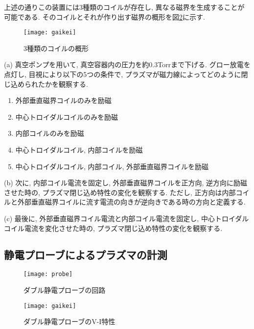 \documentclass[]{jsarticle}
\begin{document}
	上述の通りこの装置には3種類のコイルが存在し, 異なる磁界を生成することが可能である. そのコイルとそれが作り出す磁界の概形を図\ref{gaikei}に示す. 
	
	\begin{figure}[htbp]
	\begin{center}
	\texttt{[image: gaikei]}
	\caption{3種類のコイルの概形}
	\label{gaikei}
	\end{center}
	\end{figure}

	
	(a) 真空ポンプを用いて, 真空容器内の圧力を約0.3Torrまで下げる. グロー放電を点灯し, 目視により以下の5つの条件で, プラズマが磁力線によってどのように閉じ込められたかを観察する. 
	\begin{enumerate}
		\renewcommand{\labelenumi}{\Alph{enumi})}
		\item 外部垂直磁界コイルのみを励磁
		\item 中心トロイダルコイルのみを励磁
		\item 内部コイルのみを励磁
		\item 中心トロイダルコイル, 内部コイルを励磁
		\item 中心トロイダルコイル, 内部コイル, 外部垂直磁界コイルを励磁
	\end{enumerate}
	
	(b) 次に, 内部コイル電流を固定し, 外部垂直磁界コイルを正方向, 逆方向に励磁させた時の, プラズマ閉じ込め特性の変化を観察する. ただし, 正方向は内部コイルと外部垂直磁界コイルに流す電流の向きが逆向きである時の方向と定義する. 
	
	(c) 最後に, 外部垂直磁界コイル電流と内部コイル電流を固定し, 中心トロイダルコイル電流を変化させた時の, プラズマ閉じ込め特性の変化を観察する. 
	
	\subsection{静電プローブによるプラズマの計測\label{seiden}}
	
		\begin{figure}[htbp]
		\begin{minipage}{0.5\hsize}
			\begin{center}
				\texttt{[image: probe]}
				\caption{ダブル静電プローブの回路\cite{t}}
				\label{probe}
			\end{center}
		\end{minipage}
		\begin{minipage}{0.5\hsize}
			\begin{center}
				\texttt{[image: gaikei]}
				\caption{ダブル静電プローブのV-I特性\cite{t}}
				\label{gaikei}
			\end{center}
		\end{minipage}
	\end{figure}
\end{document}
